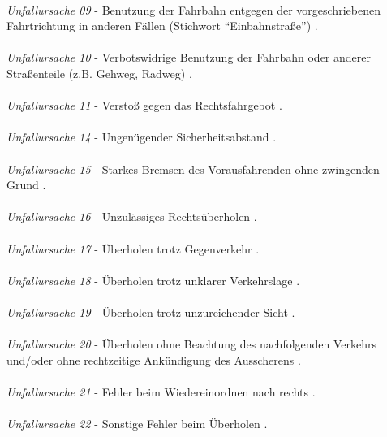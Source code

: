 \\
\textit{Unfallursache 09} - Benutzung der Fahrbahn entgegen der vorgeschriebenen Fahrtrichtung in anderen Fällen (Stichwort \enquote{Einbahnstraße}) \parencite{PolizeiprasidiumOberbeyernSud.2016}.\\
\\
\textit{Unfallursache 10} - Verbotswidrige Benutzung der Fahrbahn oder anderer Straßenteile (z.B. Gehweg, Radweg) \parencite{PolizeiprasidiumOberbeyernSud.2016}.\\
\\
\textit{Unfallursache 11} - Verstoß gegen das Rechtsfahrgebot \parencite{PolizeiprasidiumOberbeyernSud.2016}.\\
\\
\textit{Unfallursache 14} - Ungenügender Sicherheitsabstand \parencite{PolizeiprasidiumOberbeyernSud.2016}.\\
\\
\textit{Unfallursache 15} - Starkes Bremsen des Vorausfahrenden ohne zwingenden Grund \parencite{PolizeiprasidiumOberbeyernSud.2016}.\\
\\
\textit{Unfallursache 16} - Unzulässiges Rechtsüberholen \parencite{PolizeiprasidiumOberbeyernSud.2016}.\\
\\
\textit{Unfallursache 17} - Überholen trotz Gegenverkehr \parencite{PolizeiprasidiumOberbeyernSud.2016}.\\
\\
\textit{Unfallursache 18} - Überholen trotz unklarer Verkehrslage \parencite{PolizeiprasidiumOberbeyernSud.2016}.\\
\\
\textit{Unfallursache 19} - Überholen trotz unzureichender Sicht \parencite{PolizeiprasidiumOberbeyernSud.2016}.\\
\\
\textit{Unfallursache 20} - Überholen ohne Beachtung des nachfolgenden Verkehrs und/oder ohne rechtzeitige Ankündigung des Ausscherens \parencite{PolizeiprasidiumOberbeyernSud.2016}.\\
\\
\textit{Unfallursache 21} - Fehler beim Wiedereinordnen nach rechts \parencite{PolizeiprasidiumOberbeyernSud.2016}.\\
\\
\textit{Unfallursache 22} - Sonstige Fehler beim Überholen \parencite{PolizeiprasidiumOberbeyernSud.2016}.\\
\\
